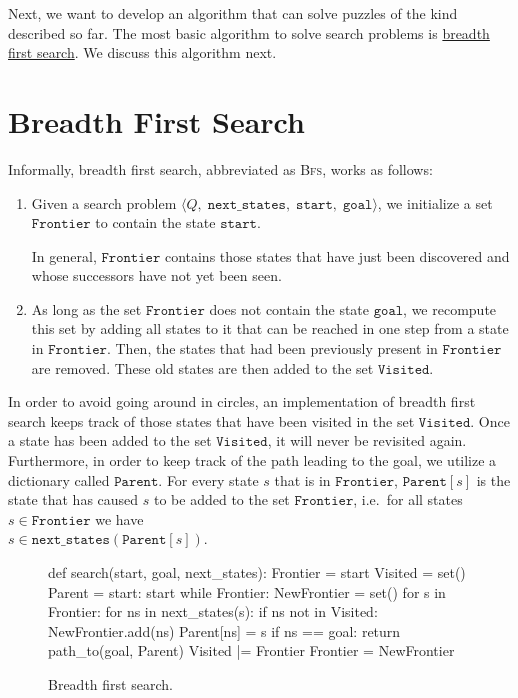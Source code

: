 Next, we want to develop an algorithm that can solve puzzles of the kind described so far.  The most basic
algorithm to solve search problems is \href{https://en.wikipedia.org/wiki/Breadth-first_search}{breadth first search}.
We discuss this algorithm next.

\section{Breadth First Search}
Informally, breadth first search, abbreviated as \textsc{Bfs}, works as follows: 
\begin{enumerate}
\item Given a search problem $\langle Q,\;\mathtt{next\_states},\; \mathtt{start},\; \mathtt{goal}\rangle$,
      we initialize a set $\texttt{Frontier}$ to contain the state $\texttt{start}$.

      In general, $\texttt{Frontier}$ contains those states that have just been discovered and whose successors have not
      yet been seen.
\item As long as the set $\texttt{Frontier}$ does not contain the state $\texttt{goal}$, we recompute this set
      by adding all states to it that can be reached in one step from a state in $\texttt{Frontier}$.
      Then, the states that had been previously present in $\texttt{Frontier}$ are removed.
      These old states are then added to the set $\texttt{Visited}$.
\end{enumerate}
In order to avoid going around in circles, an implementation of breadth first search keeps track of those
states that have been visited in the set $\texttt{Visited}$.  Once a state has been added to
the set $\texttt{Visited}$,  it will never be revisited again.
Furthermore, in order to keep track of the path leading to the goal, we utilize a dictionary called
$\texttt{Parent}$.  For every state $s$ that is in $\texttt{Frontier}$, $\mathtt{Parent}[s]$ is the state that
has caused $s$ to be added to the set $\texttt{Frontier}$, i.e.~for all states $s\in\mathtt{Frontier}$ 
we have 
\\[0.2cm]
\hspace*{1.3cm}
$s \in \mathtt{next\_states}(\mathtt{Parent}[s])$.


\begin{figure}[!ht]
\centering
\begin{python3code}
    def search(start, goal, next_states):
        Frontier = { start }
        Visited  = set()
        Parent   = { start: start }
        while Frontier:
            NewFrontier = set()
            for s in Frontier:
                for ns in next_states(s):
                    if ns not in Visited:
                        NewFrontier.add(ns)
                        Parent[ns] = s
                        if ns == goal:
                            return path_to(goal, Parent)
            Visited |= Frontier
            Frontier = NewFrontier
\end{python3code}
\vspace*{-0.3cm}
\caption{Breadth first search.}
\label{fig:Breadth-First-Search.ipynb}
\end{figure}
\vspace*{0.2cm}

